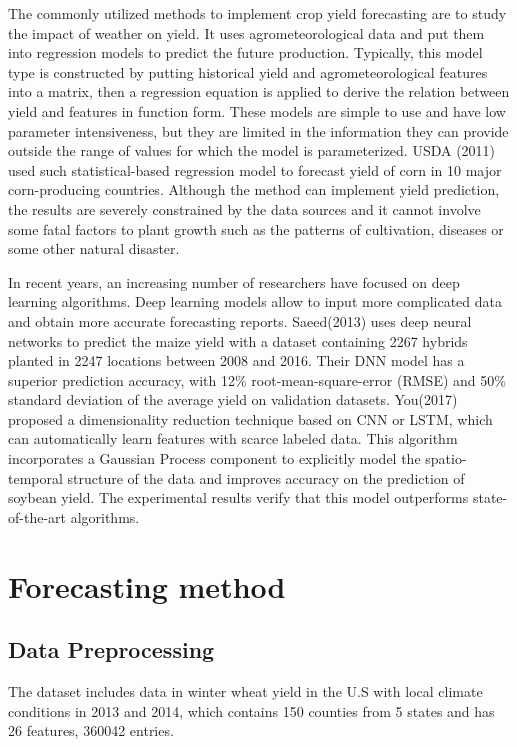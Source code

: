 \documentclass[conference, a4paper]{IEEEtran}
\begin{document}
    The commonly utilized methods to implement crop yield forecasting are to study the impact of weather on yield. It uses agrometeorological data and put them into regression models to predict the future production. Typically, this model type is constructed by putting historical yield and agrometeorological features into a matrix, then a regression equation is applied to derive the relation between yield and features in function form. These models are simple to use and have low parameter intensiveness, but they are limited in the information they can provide outside the range of values for which the model is parameterized. USDA (2011)\cite{good2011usda} used such statistical-based regression model to forecast yield of corn in 10 major corn-producing countries. Although the method can implement yield prediction, the results are severely constrained by the data sources and it cannot involve some fatal factors to plant growth such as the patterns of cultivation, diseases or some other natural disaster.  

    In recent years, an increasing number of researchers have focused on deep learning algorithms. Deep learning models allow to input more complicated data and obtain more accurate forecasting reports. Saeed(2013)\cite{Basso2013} uses deep neural networks to predict the maize yield with a dataset containing 2267 hybrids planted in 2247 locations between 2008 and 2016. Their DNN model has a superior prediction accuracy, with 12\% root-mean-square-error (RMSE) and 50\% standard deviation of the average yield on validation datasets. You(2017)\cite{You2017} proposed a dimensionality reduction technique based on CNN or LSTM, which can automatically learn features with scarce labeled data. This algorithm incorporates a Gaussian Process component to explicitly model the spatio-temporal structure of the data and improves accuracy on the prediction of soybean yield. The experimental results verify that this model outperforms state-of-the-art algorithms.


\section{Forecasting method} \label{sec:fm}
  \subsection{Data Preprocessing} 
      The dataset includes data in winter wheat yield in the U.S with local climate conditions in 2013 and 2014, which contains 150 counties from 5 states and has 26 features, 360042 entries.
\end{document}
